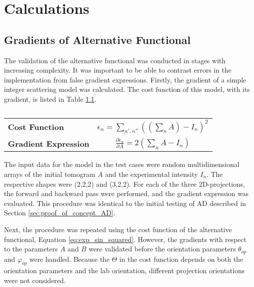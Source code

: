 
\chapter{Calculations}

\section{Gradients of Alternative Functional} %

The validation of the alternative functional was conducted in stages with increasing complexity.
It was important to be able to contrast errors in the implementation from false gradient expressions.
Firstly, the gradient of a simple integer scattering model was calculated. The cost function of this model, with its gradient, is listed in Table \ref{tab:integer_model}.

\begin{table}[h]
    \centering
    \caption{}
    \label{tab:integer_model}
    \begin{tabular}{ l c }
        \hline
        \textbf{Cost Function}       & $\epsilon_{n} = \sum_{n', n''} ( (\sum_{n} A) - I_{n})^2 $           \\
        \textbf{Gradient Expression} & $\frac{\partial \epsilon_{n}}{\partial A} = 2 (\sum_{n} A - I_{n}) $ \\
        \hline
    \end{tabular}
\end{table}

The input data for the model in the test cases were random multidimensional arrays of the initial tomogram $A$ and the experimental intensity $I_{n}$.
The respective shapes were (2,2,2) and (3,2,2).
For each of the three 2D-projections, the forward and backward pass were performed, and the gradient expression was evaluated. %
This procedure was identical to the initial testing of AD described in Section \ref{sec:proof_of_concept_AD}.

Next, the procedure was repeated using the cost function of the alternative functional, Equation \eqref{eq:exp_sin_squared}.
However, the gradients with respect to the parameters $A$ and $B$ were validated before the orientation parameters $\theta_{op}$ and $\varphi_{op}$ were handled.
Because the $\Theta$ in the cost function depends on both the orientation parameters and the lab orientation, different projection orientations were not considered.

